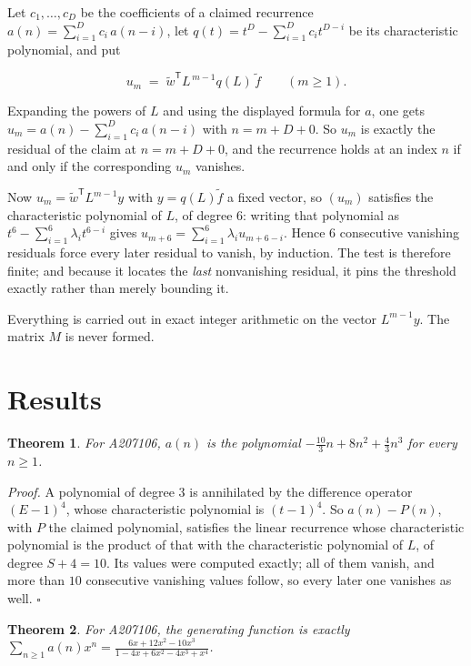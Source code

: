 \documentclass[11pt]{article}
\newtheorem{theorem}{Theorem}
\theoremstyle{definition}
\begin{document}
Let $c_1,\dots,c_D$ be the coefficients of a claimed recurrence $a(n) = \sum_{i=1}^{D} c_i\,a(n-i)$, let $q(t) = t^{D} - \sum_{i=1}^{D} c_i t^{D-i}$ be its characteristic polynomial, and put

\[u_m \;=\; \tilde w^{\mathsf T} L^{\,m-1} q(L)\,\tilde f \qquad (m \ge 1).\]

Expanding the powers of $L$ and using the displayed formula for $a$, one gets $u_m = a(n) - \sum_{i=1}^{D} c_i\,a(n-i)$ with $n = m + D + 0$. So $u_m$ is exactly the residual of the claim at $n = m + D + 0$, and the recurrence holds at an index $n$ if and only if the corresponding $u_m$ vanishes.

Now $u_m = \tilde w^{\mathsf T} L^{m-1} y$ with $y = q(L)\tilde f$ a fixed vector, so $(u_m)$ satisfies the characteristic polynomial of $L$, of degree $6$: writing that polynomial as $t^{6} - \sum_{i=1}^{6} \lambda_i t^{6-i}$ gives $u_{m+6} = \sum_{i=1}^{6} \lambda_i u_{m+6-i}$. Hence $6$ consecutive vanishing residuals force every later residual to vanish, by induction. The test is therefore finite; and because it locates the {\itshape last} nonvanishing residual, it pins the threshold exactly rather than merely bounding it.

Everything is carried out in exact integer arithmetic on the vector $L^{m-1}y$. The matrix $M$ is never formed.

\section{Results}

\begin{theorem} For A207106, $a(n)$ is the polynomial $-\frac{10}{3}n + 8n^{2} + \frac{4}{3}n^{3}$ for every $n \ge 1$.\end{theorem}

{\itshape Proof.} A polynomial of degree $3$ is annihilated by the difference operator $(E-1)^{4}$, whose characteristic polynomial is $(t-1)^{4}$. So $a(n) - P(n)$, with $P$ the claimed polynomial, satisfies the linear recurrence whose characteristic polynomial is the product of that with the characteristic polynomial of $L$, of degree $S + 4 = 10$. Its values were computed exactly; all of them vanish, and more than $10$ consecutive vanishing values follow, so every later one vanishes as well. $\square$

\begin{theorem} For A207106, the generating function is exactly $\sum_{n\ge 1} a(n)x^n = \frac{6x + 12x^{2} - 10x^{3}}{1 - 4x + 6x^{2} - 4x^{3} + x^{4}}$.\end{theorem}
\end{document}
